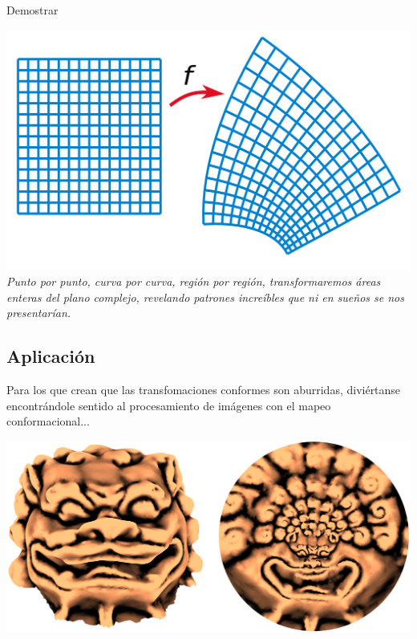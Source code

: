 \documentclass[12pt]{article}
\theoremstyle{definition}
\theoremstyle{theorem}
\theoremstyle{corolary}
\begin{document}
Demostrar

\begin{center}
	\includegraphics[scale=0.27]{conforme.png}\\
	\textit{Punto por punto, curva por curva, regi\'on por regi\'on, transformaremos \'areas enteras del plano complejo, revelando patrones incre\'ibles que ni en sue\~nos se nos presentar\'ian.}\\
\end{center}

\subsection{Aplicaci\'on}
Para los que crean que las transfomaciones conformes son aburridas, divi\'ertanse encontr\'andole sentido al procesamiento de im\'agenes con el mapeo conformacional...

\begin{center}
	\includegraphics[scale=0.4]{matlab_conformal.png}
\end{center}
\end{document}
